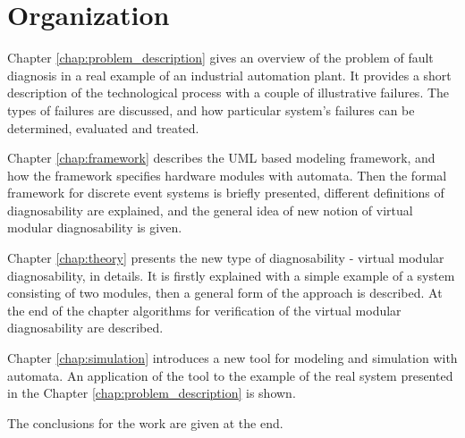 \section*{Organization}

Chapter \ref{chap:problem_description} gives an overview of the problem of
fault diagnosis in a real example of an industrial automation plant. It
provides a short description of the technological process with a couple of
illustrative failures. The types of failures are discussed, and how particular
system's failures can be determined, evaluated and treated. 

Chapter \ref{chap:framework} describes the UML based modeling framework, and how 
the framework specifies hardware modules with automata. Then the
formal framework for discrete event systems is briefly presented, different
definitions of diagnosability are explained, and the general idea of new notion
of virtual modular diagnosability is given.

Chapter \ref{chap:theory} presents the new type of diagnosability -
virtual modular diagnosability, in details. It is firstly explained with a
simple example of a system consisting of two modules, then a general form of
the approach is described. At the end of the chapter algorithms for verification
of the virtual modular diagnosability are described.

Chapter \ref{chap:simulation} introduces a new tool for modeling and simulation
with automata. An application of the tool to the example of the real system
presented in the Chapter \ref{chap:problem_description} is shown.

The conclusions for the work are given at the end. 

